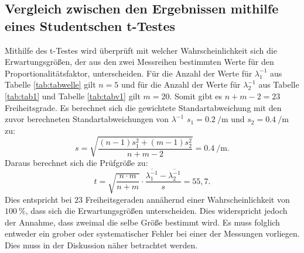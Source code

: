 \subsection{Vergleich zwischen den Ergebnissen mithilfe eines Studentschen t-Testes}
Mithilfe des t-Testes wird überprüft mit welcher Wahrscheinlichkeit sich die Erwartungsgrößen, der aus den zwei Messreihen bestimmten Werte für den Proportionalitätsfaktor, unterscheiden. Für die Anzahl der Werte für $\lambda_1 ^{-1}$ aus Tabelle \ref{tab:tabwelle} gilt $n=5$ und für die Anzahl der Werte für $\lambda_2 ^{-1}$ aus Tabelle \ref{tab:tab1} und Tabelle \ref{tab:tabv1} gilt $m=20$. Somit gibt es $n+m-2=23$ Freiheitsgrade. Es berechnet sich die gewichtete Standartabweichung mit den zuvor berechneten Standartabweichungen von $\lambda ^{-1}$ $s_1 = \SI{0.2}{\per\meter}$ und $s_2 = \SI{0.4}{\per\meter}$ zu:
\begin{displaymath}
	s = \sqrt{\frac{(n-1)s_1^2+(m-1)s_2^2}{n+m-2}} = \SI{0.4}{\per\meter}\text{.}
\end{displaymath}
Daraus berechnet sich die Prüfgröße zu:
\begin{displaymath}
	t = \sqrt{\frac{n \cdot m}{n+m}} \cdot \frac{\overline{\lambda_1^{-1}} -\overline{\lambda_2^{-1}}}{s} = 55,7\text{.}
\end{displaymath}
Dies entspricht bei $23$ Freiheitsgeraden annähernd einer Wahrscheinlichkeit von $\SI{100}{\percent}$, dass sich die Erwartungsgrößen unterscheiden. Dies widerspricht jedoch der Annahme, dass zweimal die selbe Größe bestimmt wird. Es muss folglich entweder ein grober oder systematischer Fehler bei einer der Messungen vorliegen. Dies muss in der Diskussion näher betrachtet werden.



